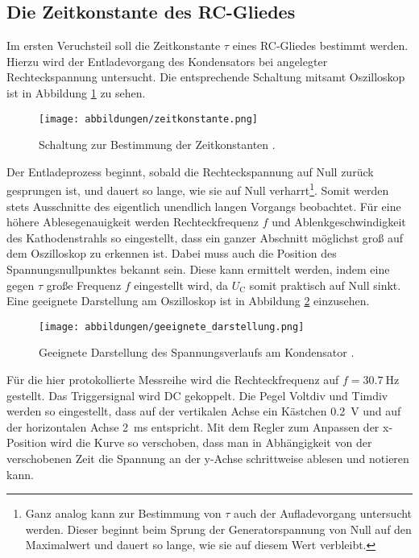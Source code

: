 \subsection{Die Zeitkonstante des RC-Gliedes}
Im ersten Veruchsteil soll die Zeitkonstante $\tau$ eines RC-Gliedes bestimmt werden.
Hierzu wird der Entladevorgang des Kondensators bei angelegter Rechteckspannung untersucht.
Die entsprechende Schaltung mitsamt Oszilloskop ist in Abbildung \ref{fig:zeitkonst} zu sehen.
\begin{figure}[H]
    \centering
    \texttt{[image: abbildungen/zeitkonstante.png]}
    \caption[short]{Schaltung zur Bestimmung der Zeitkonstanten \cite{man:v353}.}
    \label{fig:zeitkonst}
\end{figure}
\noindent
Der Entladeprozess beginnt, sobald die Rechteckspannung auf Null zurück gesprungen ist, und dauert so lange, wie sie auf Null verharrt\footnote{Ganz 
analog kann zur Bestimmung von $\tau$ auch der Aufladevorgang untersucht werden.
Dieser beginnt beim Sprung der Generatorspannung von Null auf den Maximalwert und dauert so lange, 
wie sie auf diesem Wert verbleibt.}.
Somit werden stets Ausschnitte des eigentlich unendlich langen Vorgangs beobachtet.
Für eine höhere Ablesegenauigkeit werden Rechteckfrequenz $f$ und Ablenkgeschwindigkeit des Kathodenstrahls so eingestellt, 
dass ein ganzer Abschnitt möglichst groß auf dem Oszilloskop zu erkennen ist.
Dabei muss auch die Position des Spannungsnullpunktes bekannt sein.
Diese kann ermittelt werden, indem eine gegen $\tau$ große Frequenz $f$ eingestellt wird, da $U_\text{C}$ somit praktisch auf Null sinkt.
Eine geeignete Darstellung am Oszilloskop ist in Abbildung \ref{fig:spannungsverlauf} einzusehen.
\begin{figure}[H]
    \centering
    \texttt{[image: abbildungen/geeignete\_darstellung.png]}
    \caption{Geeignete Darstellung des Spannungsverlaufs am Kondensator \cite{man:v353}.}
    \label{fig:spannungsverlauf}
\end{figure}
\noindent
Für die hier protokollierte Messreihe wird die Rechteckfrequenz auf $f = \qty{30.7}{\hertz}$ gestellt.
Das Triggersignal wird DC gekoppelt.
Die Pegel Voltdiv und Timdiv werden so eingestellt, 
dass auf der vertikalen Achse ein Kästchen \qty[]{0.2}{\volt} und auf der horizontalen Achse \qty{2}{\ms} entspricht.
Mit dem Regler zum Anpassen der x-Position wird die Kurve so verschoben, 
dass man in Abhängigkeit von der verschobenen Zeit die Spannung an der y-Achse schrittweise ablesen und notieren kann.